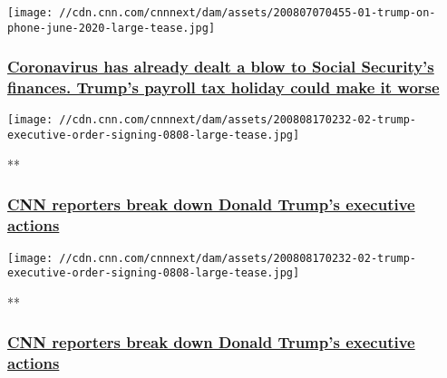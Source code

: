 \href{/2020/08/07/politics/social-security-medicare-trump-payroll-taxes/index.html}{}

\texttt{[image: //cdn.cnn.com/cnnnext/dam/assets/200807070455-01-trump-on-phone-june-2020-large-tease.jpg]}

\hypertarget{coronavirus-has-already-dealt-a-blow-to-social-securitys-finances-trumps-payroll-tax-holiday-could-make-it-worse}{%
\subsubsection{\texorpdfstring{\href{/2020/08/07/politics/social-security-medicare-trump-payroll-taxes/index.html}{Coronavirus
has already dealt a blow to Social Security's finances. Trump's payroll
tax holiday could make it
worse}}{Coronavirus has already dealt a blow to Social Security's finances. Trump's payroll tax holiday could make it worse}}\label{coronavirus-has-already-dealt-a-blow-to-social-securitys-finances-trumps-payroll-tax-holiday-could-make-it-worse}}

\href{/videos/politics/2020/08/08/trump-signs-executive-actions-unemployment-stimulus-holmes-dale-nr-vpx.cnn}{}

\texttt{[image: //cdn.cnn.com/cnnnext/dam/assets/200808170232-02-trump-executive-order-signing-0808-large-tease.jpg]}

**

\hypertarget{cnn-reporters-break-down-donald-trumps-executive-actions}{%
\subsubsection{\texorpdfstring{\href{/videos/politics/2020/08/08/trump-signs-executive-actions-unemployment-stimulus-holmes-dale-nr-vpx.cnn}{CNN
reporters break down Donald Trump's executive
actions}}{CNN reporters break down Donald Trump's executive actions}}\label{cnn-reporters-break-down-donald-trumps-executive-actions}}

\href{/videos/politics/2020/08/08/trump-signs-executive-orders-unemployment-stimulus-holmes-dale-nr-vpx.cnn}{}

\texttt{[image: //cdn.cnn.com/cnnnext/dam/assets/200808170232-02-trump-executive-order-signing-0808-large-tease.jpg]}

**

\hypertarget{cnn-reporters-break-down-donald-trumps-executive-actions-1}{%
\subsubsection{\texorpdfstring{\href{/videos/politics/2020/08/08/trump-signs-executive-orders-unemployment-stimulus-holmes-dale-nr-vpx.cnn}{CNN
reporters break down Donald Trump's executive
actions}}{CNN reporters break down Donald Trump's executive actions}}\label{cnn-reporters-break-down-donald-trumps-executive-actions-1}}

